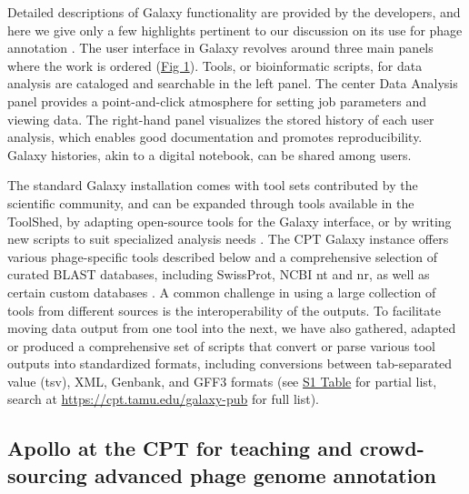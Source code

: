 Detailed descriptions of Galaxy functionality are provided by the
developers, and here we give only a few highlights pertinent to our
discussion on its use for phage annotation \cite{Afgan_2018}. The user interface
in Galaxy revolves around three main panels where the work is ordered
(\protect\hyperlink{pcbi.1008214.g001}{Fig 1}). Tools, or bioinformatic
scripts, for data analysis are cataloged and searchable in the left
panel. The center Data Analysis panel provides a point-and-click
atmosphere for setting job parameters and viewing data. The right-hand
panel visualizes the stored history of each user analysis, which enables
good documentation and promotes reproducibility. Galaxy histories, akin
to a digital notebook, can be shared among users.

The standard Galaxy installation comes with tool sets contributed by the
scientific community, and can be expanded through tools available in the
ToolShed, by adapting open-source tools for the Galaxy interface, or by
writing new scripts to suit specialized analysis needs \cite{Blankenberg_2014,Cock_2013,Cock_2009}. The
CPT Galaxy instance offers various phage-specific tools described below
and a comprehensive selection of curated BLAST databases, including
SwissProt, NCBI nt and nr, as well as certain custom databases \cite{2018}.
A common challenge in using a large collection of tools from different
sources is the interoperability of the outputs. To facilitate moving
data output from one tool into the next, we have also gathered, adapted
or produced a comprehensive set of scripts that convert or parse various
tool outputs into standardized formats, including conversions between
tab-separated value (tsv), XML, Genbank, and GFF3 formats (see
\protect\hyperlink{pcbi.1008214.s001}{S1 Table} for partial list, search
at \url{https://cpt.tamu.edu/galaxy-pub} for full list).

\subsection*{Apollo at the CPT for teaching and crowd-sourcing advanced
phage genome annotation}

